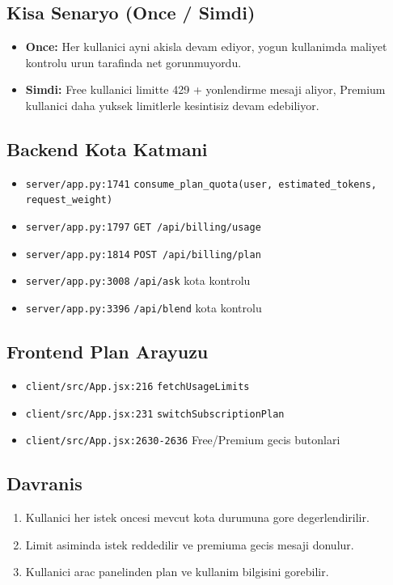\documentclass[12pt,a4paper]{article}
\begin{document}
\subsection{Kisa Senaryo (Once / Simdi)}
\begin{itemize}[leftmargin=*]
  \item \textbf{Once:} Her kullanici ayni akisla devam ediyor,
  yogun kullanimda maliyet kontrolu urun tarafinda net gorunmuyordu.
  \item \textbf{Simdi:} Free kullanici limitte 429 + yonlendirme mesaji aliyor,
  Premium kullanici daha yuksek limitlerle kesintisiz devam edebiliyor.
\end{itemize}

\subsection{Backend Kota Katmani}
\begin{itemize}[leftmargin=*]
  \item \texttt{server/app.py:1741} \texttt{consume\_plan\_quota(user, estimated\_tokens, request\_weight)}
  \item \texttt{server/app.py:1797} \texttt{GET /api/billing/usage}
  \item \texttt{server/app.py:1814} \texttt{POST /api/billing/plan}
  \item \texttt{server/app.py:3008} \texttt{/api/ask} kota kontrolu
  \item \texttt{server/app.py:3396} \texttt{/api/blend} kota kontrolu
\end{itemize}

\subsection{Frontend Plan Arayuzu}
\begin{itemize}[leftmargin=*]
  \item \texttt{client/src/App.jsx:216} \texttt{fetchUsageLimits}
  \item \texttt{client/src/App.jsx:231} \texttt{switchSubscriptionPlan}
  \item \texttt{client/src/App.jsx:2630-2636} Free/Premium gecis butonlari
\end{itemize}

\subsection{Davranis}
\begin{enumerate}[leftmargin=*]
  \item Kullanici her istek oncesi mevcut kota durumuna gore degerlendirilir.
  \item Limit asiminda istek reddedilir ve premiuma gecis mesaji donulur.
  \item Kullanici arac panelinden plan ve kullanim bilgisini gorebilir.
\end{enumerate}
\end{document}
